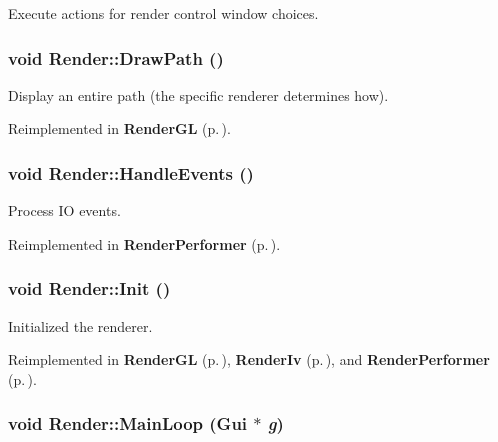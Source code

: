 Execute actions for render control window choices.

\subsubsection{\setlength{\rightskip}{0pt plus 5cm}void Render::Draw\-Path ()\hspace{0.3cm}{\tt  [inline, virtual]}}\label{class_Render_a12}


Display an entire path (the specific renderer determines how).



Reimplemented in {\bf Render\-GL} {\rm (p.\,\pageref{class_RenderGL_b11})}.
\subsubsection{\setlength{\rightskip}{0pt plus 5cm}void Render::Handle\-Events ()\hspace{0.3cm}{\tt  [inline, virtual]}}\label{class_Render_a5}


Process IO events.



Reimplemented in {\bf Render\-Performer} {\rm (p.\,\pageref{class_RenderPerformer_a5})}.
\subsubsection{\setlength{\rightskip}{0pt plus 5cm}void Render::Init ()\hspace{0.3cm}{\tt  [virtual]}}\label{class_Render_a4}


Initialized the renderer.



Reimplemented in {\bf Render\-GL} {\rm (p.\,\pageref{class_RenderGL_a5})}, {\bf Render\-Iv} {\rm (p.\,\pageref{class_RenderIv_a5})}, and {\bf Render\-Performer} {\rm (p.\,\pageref{class_RenderPerformer_a4})}.
\subsubsection{\setlength{\rightskip}{0pt plus 5cm}void Render::Main\-Loop ({\bf Gui} $\ast$ {\em g})\hspace{0.3cm}{\tt  [virtual]}}\label{class_Render_a6}


